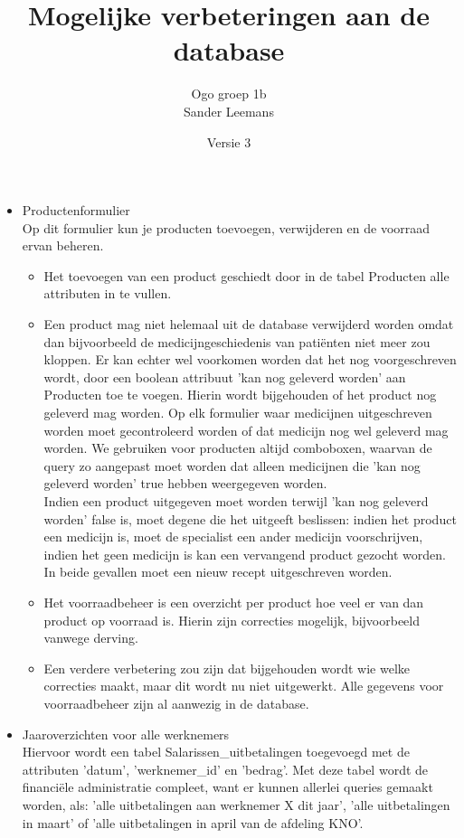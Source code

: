 \documentclass[10pt,twoside]{report}
\author{Ogo groep 1b\\Sander Leemans}
\date{ Versie 3 }
\title{Mogelijke verbeteringen aan de database}
\begin{document}
\maketitle

\begin{itemize}
\item Productenformulier\\
Op dit formulier kun je producten toevoegen, verwijderen en de voorraad ervan beheren.\\
    \begin{itemize}
    \item Het toevoegen van een product geschiedt door in de tabel Producten alle attributen in te vullen.
    \item Een product mag niet helemaal uit de database verwijderd worden omdat dan bijvoorbeeld de medicijngeschiedenis van pati\"enten niet meer zou kloppen. Er kan echter wel voorkomen worden dat het nog voorgeschreven wordt, door een boolean attribuut 'kan nog geleverd worden' aan Producten toe te voegen.
    Hierin wordt bijgehouden of het product nog geleverd mag worden. Op elk formulier waar medicijnen uitgeschreven worden moet gecontroleerd worden of dat medicijn nog wel geleverd mag worden. We gebruiken voor producten altijd comboboxen, waarvan de query zo aangepast moet worden dat alleen medicijnen die 'kan nog geleverd worden' true hebben weergegeven worden.\\
    Indien een product uitgegeven moet worden terwijl 'kan nog geleverd worden' false is, moet degene die het uitgeeft beslissen: indien het product een medicijn is, moet de specialist een ander medicijn voorschrijven, indien het geen medicijn is kan een vervangend product gezocht worden. In beide gevallen moet een nieuw recept uitgeschreven worden.
    \item Het voorraadbeheer is een overzicht per product hoe veel er van dan product op voorraad is. Hierin zijn correcties mogelijk, bijvoorbeeld vanwege derving.\\
    \item Een verdere verbetering zou zijn dat bijgehouden wordt wie welke correcties maakt, maar dit wordt nu niet uitgewerkt.
    Alle gegevens voor voorraadbeheer zijn al aanwezig in de database.
    \end{itemize}

\item Jaaroverzichten voor alle werknemers\\
Hiervoor wordt een tabel Salarissen\_uitbetalingen toegevoegd met de attributen 'datum', 'werknemer\_id' en 'bedrag'.
Met deze tabel wordt de financi\"ele administratie compleet, want er kunnen allerlei queries gemaakt worden, als: 'alle uitbetalingen aan werknemer X dit jaar', 'alle uitbetalingen in maart' of 'alle uitbetalingen in april van de afdeling KNO'.


\end{itemize}
\end{document}
